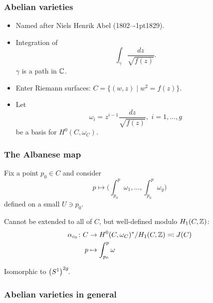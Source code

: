 \begin{frame}
\frametitle{Abelian varieties}

\begin{itemize}
	\item Named after Niels Henrik Abel (1802--\kern-1pt1829).
	\item Integration of
	\[
	\int_\gamma \frac{dz}{\sqrt{f(z)}}.
	\]
	$\gamma$ is a path in $\mathbb{C}$. \pause
	\item Enter Riemann surfaces: $C=\big\{ (w,z) \mid w^2=f(z) \big\}$.
	\item Let 
	\[
	\omega_i = z^{i-1} \frac{dz}{\sqrt{f(z)}}, \, \, i=1,\ldots,g
	\]
	be a basis for $H^0(C,\omega_C)$.
\end{itemize}

\end{frame}


\begin{frame}
\frametitle{The Albanese map}

Fix a point $p_0 \in C$ and consider
\[
p \mapsto \Bigg(
\int_{p_0}^p \omega_1, \ldots,  \int_{p_0}^p \omega_g
\Bigg)
\]
defined on a small $U \ni p_0$.
\pause

Cannot be extended to all of $C$, but well-defined modulo $H_1(C,\mathbb{Z})$:
\begin{align*}
\alpha_{c_0}\colon C &\to H^0(C,\omega_C)^\ast/ H_1(C,\mathbb{Z}) \eqqcolon J(C) \\
p &\mapsto \int_{p_0}^p \omega
\end{align*}

Isomorphic to $\big(S^1\big)^{2g}\mkern-3mu$.
\end{frame}

\begin{frame}
\frametitle{Abelian varieties in general}


\end{frame}

